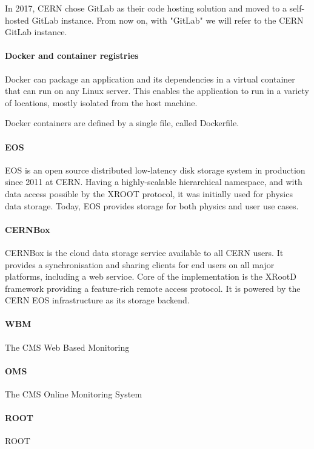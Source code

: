 In 2017, CERN chose GitLab as their code hosting solution and moved to a self-hosted GitLab instance. From now on, with "GitLab" we will refer to the CERN GitLab instance.

\paragraph{Docker and container registries}

Docker can package an application and its dependencies in a virtual container that can run on any Linux server. This enables the application to run in a variety of locations, mostly isolated from the host machine.

Docker containers are defined by a single file, called Dockerfile. 

\paragraph{EOS}

EOS \cite{Peters_2015} is an open source distributed low-latency disk storage system in production since 2011 at CERN. Having a highly-scalable hierarchical namespace, and with data access possible by the XROOT protocol, it was initially used for physics data storage. Today, EOS provides storage for both physics and user use cases.

\paragraph{CERNBox}

CERNBox \cite{Mascetti_2015} is the cloud data storage service available to all CERN users. It provides a synchronisation and sharing clients for end users on all major platforms, including a web servioe. Core of the implementation is the XRootD framework providing a feature-rich remote access protocol.  It is powered by the CERN EOS infrastructure as its storage backend.

\paragraph{WBM} The CMS Web Based Monitoring \cite{badgett2014web}

\paragraph{OMS} The CMS Online Monitoring System \cite{Andre2649402} 

\paragraph{ROOT} ROOT \cite{Brun:1997pa} 


